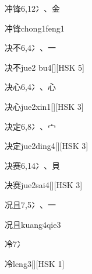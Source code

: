 \begin{entry}{冲锋}{6,12}{⼎、⾦}
  \begin{phonetics}{冲锋}{chong1feng1}
  \end{phonetics}
\end{entry}

\begin{entry}{决不}{6,4}{⼎、⼀}
  \begin{phonetics}{决不}{jue2 bu4}[][HSK 5]
  \end{phonetics}
\end{entry}

\begin{entry}{决心}{6,4}{⼎、⼼}
  \begin{phonetics}{决心}{jue2xin1}[][HSK 3]
  \end{phonetics}
\end{entry}

\begin{entry}{决定}{6,8}{⼎、⼧}
  \begin{phonetics}{决定}{jue2ding4}[][HSK 3]
  \end{phonetics}
\end{entry}

\begin{entry}{决赛}{6,14}{⼎、⾙}
  \begin{phonetics}{决赛}{jue2sai4}[][HSK 3]
  \end{phonetics}
\end{entry}

\begin{entry}{况且}{7,5}{⼎、⼀}
  \begin{phonetics}{况且}{kuang4qie3}
  \end{phonetics}
\end{entry}

\begin{entry}{冷}{7}{⼎}
  \begin{phonetics}{冷}{leng3}[][HSK 1]
  \end{phonetics}
\end{entry}

